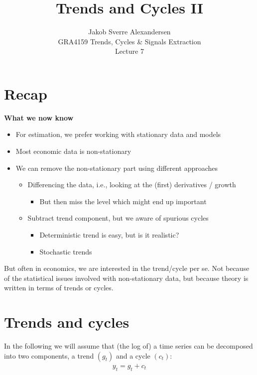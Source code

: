 \documentclass[10pt]{article}
\begin{document}
 
\title{Trends and Cycles II}
\author{Jakob Sverre Alexandersen\\
GRA4159 Trends, Cycles \& Signals Extraction\\
Lecture 7}
\maketitle

\tableofcontents
\newpage
\section{Recap}
\textbf{What we now know}
\begin{itemize}
    \item For estimation, we prefer working with stationary data and models 
    \item Most economic data is non-stationary 
    \item We can remove the non-stationary part using different approaches 
    \begin{itemize}
        \item Differencing the data, i.e., looking at the (first) derivatives / growth 
        \begin{itemize}
            \item But then miss the level which might end up important 
        \end{itemize}
        \item Subtract trend component, but we aware of spurious cycles 
        \begin{itemize}
            \item Deterministic trend is easy, but is it realistic?
            \item Stochastic trends 
        \end{itemize}
    \end{itemize}
\end{itemize}
But often in economics, we are interested in the trend/cycle per se. Not because of the statistical issues involved with non-stationary data, but because theory is written in terms of trends or cycles. 
\section{Trends and cycles}
In the following we will assume that (the log of) a time series can be decomposed into two components, a trend $(g_t) $ and a cycle $(c_t) $:
\begin{gather*}
    y_t = g_t + c_t 
\end{gather*}
\end{document}
